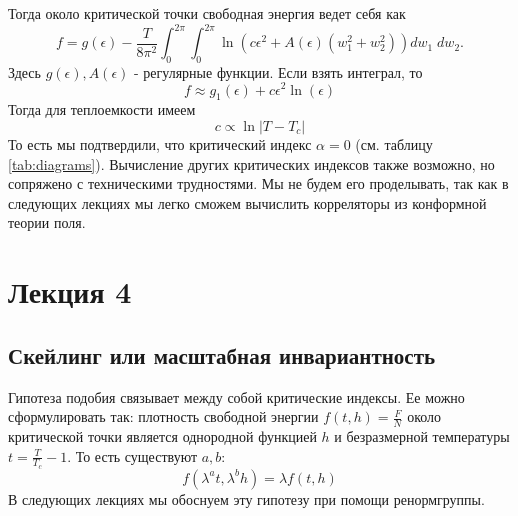 \documentclass[a4paper,12pt]{article}
\theoremstyle{definition}
\theoremstyle{definition}
\theoremstyle{definition}
\begin{document}
Тогда около критической точки свободная энергия ведет себя как
\begin{equation}
  \label{eq:141}
  f=g(\epsilon)-\frac{T}{8\pi^2}\int_{0}^{2\pi}\int_0^{2\pi}\ln \left( c\epsilon^2 +A(\epsilon)(w_1^2+w_2^2)\right)dw_1\;dw_2.
\end{equation}
Здесь $g(\epsilon), A(\epsilon)$ - регулярные функции. Если взять интеграл, то
\begin{equation}
  \label{eq:142}
  f\approx g_1 (\epsilon)+c\epsilon^2 \ln(\epsilon)
\end{equation}
Тогда для теплоемкости имеем
\begin{equation}
  \label{eq:143}
  c\propto \ln|T-T_c|
\end{equation}
То есть мы подтвердили, что критический индекс $\alpha=0$ (см. таблицу \ref{tab:diagrams}). Вычисление других критических индексов также возможно, но сопряжено с техническими трудностями. Мы не будем его проделывать, так как в следующих лекциях мы легко сможем вычислить корреляторы из конформной теории поля.

\section{Лекция 4}
\label{sec:lecture-3}


\subsection{Скейлинг или масштабная инвариантность}
\label{sec:scaling}

Гипотеза подобия связывает между собой критические индексы. Ее можно сформулировать так: плотность свободной энергии $f(t,h)=\frac{F}{N}$ около критической точки является однородной функцией $h$ и безразмерной температуры $t=\frac{T}{T_c}-1$. То есть существуют $a,b$:
\begin{equation}
  \label{eq:33}
  f(\lambda^a t,\lambda^b h)=\lambda f(t,h)
\end{equation}
В следующих лекциях мы обоснуем эту гипотезу при помощи ренормгруппы.
\end{document}
